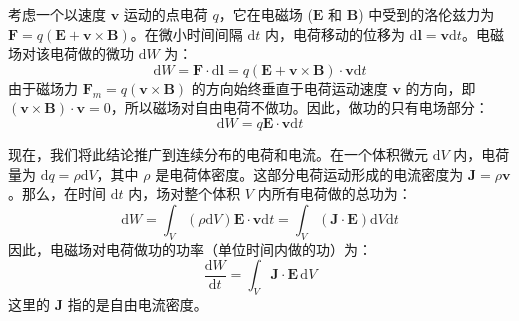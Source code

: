 \documentclass[fontset=none]{ctexart}
\begin{document}
考虑一个以速度 $\bm{v}$ 运动的点电荷 $q$，它在电磁场 ($\bm{E}$ 和 $\bm{B}$) 中受到的洛伦兹力为 $\bm{F} = q(\bm{E} + \bm{v} \times \bm{B})$。在微小时间间隔 $\mathrm{d}t$ 内，电荷移动的位移为 $\mathrm{d}\bm{l} = \bm{v}\mathrm{d}t$。电磁场对该电荷做的微功 $\mathrm{d}W$ 为：
\begin{equation}
    \mathrm{d}W = \bm{F} \cdot \mathrm{d}\bm{l} = q(\bm{E} + \bm{v} \times \bm{B}) \cdot \bm{v}\mathrm{d}t
\end{equation}
由于磁场力 $\bm{F}_m = q(\bm{v} \times \bm{B})$ 的方向始终垂直于电荷运动速度 $\bm{v}$ 的方向，即 $(\bm{v} \times \bm{B}) \cdot \bm{v} = 0$，所以磁场对自由电荷不做功。因此，做功的只有电场部分：
\begin{equation}
    \mathrm{d}W = q\bm{E} \cdot \bm{v}\mathrm{d}t
\end{equation}

现在，我们将此结论推广到连续分布的电荷和电流。在一个体积微元 $\mathrm{d}V$ 内，电荷量为 $\mathrm{d}q = \rho \mathrm{d}V$，其中 $\rho$ 是电荷体密度。这部分电荷运动形成的电流密度为 $\bm{J} = \rho \bm{v}$。那么，在时间 $\mathrm{d}t$ 内，场对整个体积 $V$ 内所有电荷做的总功为：
\begin{equation}
    \mathrm{d}W = \int_V (\rho \mathrm{d}V) \bm{E} \cdot \bm{v} \mathrm{d}t = \int_V (\bm{J} \cdot \bm{E}) \mathrm{d}V \mathrm{d}t
\end{equation}
因此，电磁场对电荷做功的功率（单位时间内做的功）为：
\begin{equation}
    \frac{\mathrm{d}W}{\mathrm{d}t} = \int_V \bm{J} \cdot \bm{E} \, \mathrm{d}V
\end{equation}
这里的 $\bm{J}$ 指的是自由电流密度。
\end{document}
